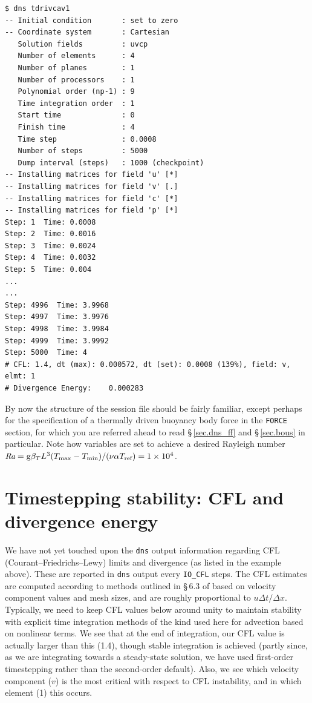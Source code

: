 \documentclass[11pt]{report}
\def\Ra{\mbox{\it Ra}}                              %
\newcommand\cg{\mathrm{g}}
\begin{document}
%
{\small
\begin{verbatim}
$ dns tdrivcav1
-- Initial condition       : set to zero
-- Coordinate system       : Cartesian
   Solution fields         : uvcp
   Number of elements      : 4
   Number of planes        : 1
   Number of processors    : 1
   Polynomial order (np-1) : 9
   Time integration order  : 1
   Start time              : 0
   Finish time             : 4
   Time step               : 0.0008
   Number of steps         : 5000
   Dump interval (steps)   : 1000 (checkpoint)
-- Installing matrices for field 'u' [*]
-- Installing matrices for field 'v' [.]
-- Installing matrices for field 'c' [*]
-- Installing matrices for field 'p' [*]
Step: 1  Time: 0.0008
Step: 2  Time: 0.0016
Step: 3  Time: 0.0024
Step: 4  Time: 0.0032
Step: 5  Time: 0.004
...
...
Step: 4996  Time: 3.9968
Step: 4997  Time: 3.9976
Step: 4998  Time: 3.9984
Step: 4999  Time: 3.9992
Step: 5000  Time: 4
# CFL: 1.4, dt (max): 0.000572, dt (set): 0.0008 (139%), field: v, elmt: 1
# Divergence Energy:    0.000283
\end{verbatim}
}

By now the structure of the session file should be fairly familiar,
except perhaps for the specification of a thermally driven buoyancy
body force in the \verb|FORCE| section, for which you are referred
ahead to read \S\,\ref{sec.dns_ff} and \S\,\ref{sec.bous} in
particular.  Note how variables are set to achieve a desired Rayleigh
number
$\Ra=\cg\beta_TL^3
(T_\textrm{max}-T_\textrm{min})/(\nu\alpha T_\textrm{ref})=1\times10^4$.

\section{Timestepping stability: CFL and divergence energy}
\label{sec.cfl}

We have not yet touched upon the \verb|dns| output information
regarding CFL (Courant--Friedrichs--Lewy) limits and divergence (as
listed in the example above).  These are reported in \verb|dns| output
every \verb|IO_CFL| steps.  The CFL estimates are computed according
to methods outlined in \S\,6.3 of \citet{kars05} based on velocity
component values and mesh sizes, and are roughly proportional to
$u\Delta t/\Delta x$.  Typically, we need to keep CFL values below
around unity to maintain stability with explicit time integration
methods of the kind used here for advection based on nonlinear terms.
We see that at the end of integration, our CFL value is actually
larger than this (1.4), though stable integration is achieved (partly
since, as we are integrating towards a steady-state solution, we have
used first-order timestepping rather than the second-order default).
Also, we see which velocity component ($v$) is the most critical with
respect to CFL instability, and in which element (1) this occurs.
\end{document}
